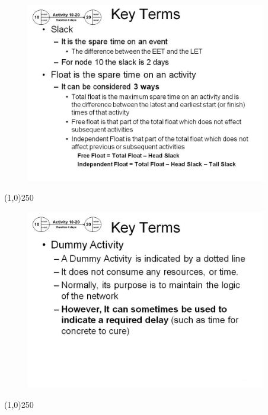 \begin{frame}
\begin{figure}
	\centering
		\includegraphics[width = 10.5cm]{oldnotes/Slide57.jpg}
\end{figure}
\end{frame}
\begin{center}\line(1,0){250}\end{center}





\begin{frame}
\begin{figure}
	\centering
		\includegraphics[width = 10.5cm]{oldnotes/Slide58.jpg}
\end{figure}
\end{frame}
\begin{center}\line(1,0){250}\end{center}









